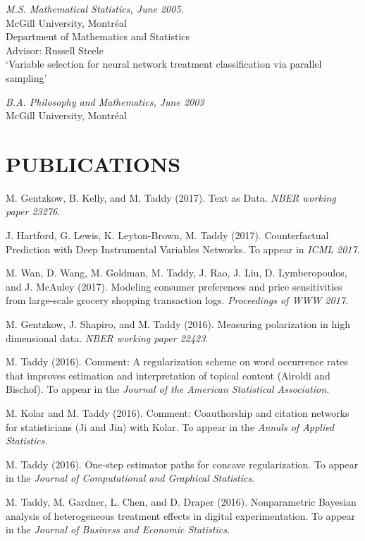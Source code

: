 \documentclass[margin,line]{res}
\begin{document}
\begin{resume}
\vspace{-0.2cm}
{\it M.S. Mathematical Statistics, June 2005.}\\
{\sc McGill University, Montr\'eal}\\
Department of Mathematics and Statistics\\
Advisor: Russell Steele\\
`Variable selection for neural network treatment classification via parallel sampling'

\vspace{-0.2cm}
{\it B.A. Philosophy and Mathematics, June 2003}\\
{\sc McGill University, Montr\'eal}

\medskip
\section{\bf PUBLICATIONS}


M. Gentzkow, B. Kelly, and M. Taddy (2017).  Text as Data. {\em NBER working paper 23276}.

J. Hartford, G. Lewis, K. Leyton-Brown, M. Taddy (2017).  Counterfactual Prediction with Deep Instrumental Variables Networks.  To appear in {\it ICML 2017}.

M. Wan, D. Wang, M. Goldman, M. Taddy, J. Rao, J. Liu, D. Lymberopoulos, and J. McAuley (2017).  Modeling consumer preferences and price sensitivities from large-scale grocery shopping transaction logs. {\it Proceedings of WWW 2017.}

M. Gentzkow, J. Shapiro, and M. Taddy (2016).  Measuring polarization in high dimensional data. {\em NBER working paper 22423}.

M. Taddy (2016). Comment: A regularization scheme on word occurrence rates that improves estimation and interpretation of topical content (Airoldi and Bischof). To appear in the {\it Journal of the American Statistical Association.} 

M. Kolar and M. Taddy (2016).  Comment: Coauthorship and citation networks for statisticians (Ji and Jin) with Kolar. To appear in the {\it Annals of Applied Statistics. }


M. Taddy (2016). One-step estimator paths for concave regularization.  To appear in the {\em Journal of Computational and Graphical Statistics}.

M. Taddy, M. Gardner, L. Chen, and D. Draper (2016).  Nonparametric Bayesian analysis of heterogeneous treatment effects in digital experimentation.  To appear in the {\em Journal of Business and Economic Statistics}.


\end{resume}
\end{document}
